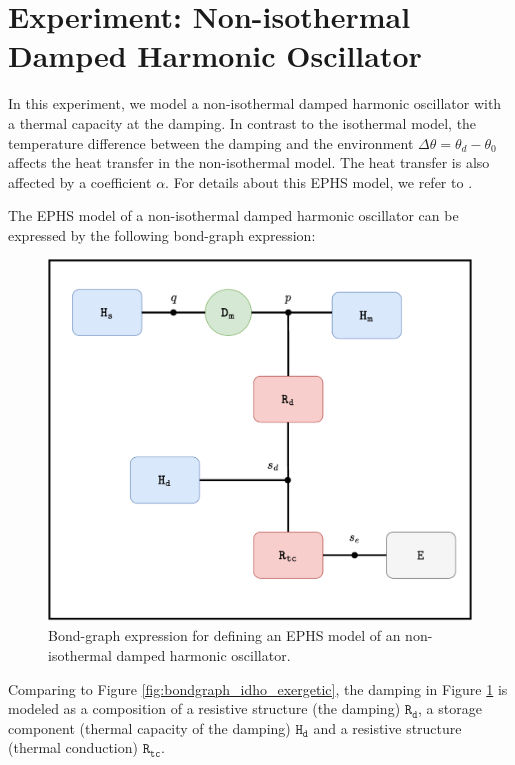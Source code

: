 \documentclass[
	parskip, 			   %
	twoside, 			   %
	DIV=14, 			   %
	BCOR=15.0mm, 		   %
	headsepline, 		   %
	open=right, 		   %
	captions=tableheading, %
	bibliography=totoc,    %
	numbers=noenddot       %
]{scrreprt}
\begin{document}
\clearpage
\section{Experiment: Non-isothermal Damped Harmonic Oscillator}
In this experiment, we model a non-isothermal damped harmonic oscillator with a thermal capacity at the damping. In contrast to the isothermal model, the temperature difference between the damping and the environment $\Delta\theta = \theta_d - \theta_0$ affects the heat transfer in the non-isothermal model. The heat transfer is also affected by a coefficient $\alpha$. For details about this EPHS model, we refer to \cite{lohmayer2021exergetic}.

The EPHS model of a non-isothermal damped harmonic oscillator can be expressed by  the following bond-graph expression: 

\begin{figure}[h!]
    \centering
    \includegraphics[scale=0.6]{figures/bondgraph_ndho_exergetic.pdf}
    \caption{Bond-graph expression for defining an EPHS model of an non-isothermal damped harmonic oscillator.}
    \label{fig:bondgraph_ndho_exergetic}
\end{figure}

Comparing to Figure \ref{fig:bondgraph_idho_exergetic}, the damping in Figure \ref{fig:bondgraph_ndho_exergetic} is modeled as a composition of a resistive structure (the damping) $\mathtt{R_d}$, a storage component (thermal capacity of the damping) $\mathtt{H_d}$ and a resistive structure (thermal conduction) $\mathtt{R_{tc}}$. 
\end{document}
